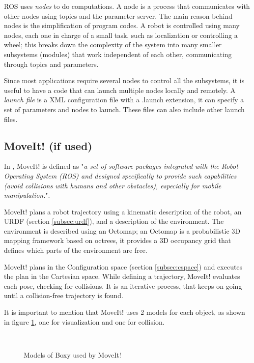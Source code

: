 ROS uses \textit{nodes} to do computations. A node is a process that communicates with other nodes using topics and the parameter server. The main reason behind nodes is the simplification of program codes. A robot is controlled using many nodes, each one in charge of a small task, such as localization or controlling a wheel; this breaks down the complexity of the system into many smaller subsystems (modules) that work independent of each other, communicating through topics and parameters.

Since most applications require several nodes to control all the subsystems, it is useful to have a code that can launch multiple nodes locally and remotely. A \textit{launch file} is a XML configuration file with a .launch extension, it can specify a set of parameters and nodes to launch. These files can also include other launch files. 

\subsection{MoveIt! (if used)}
\label{subsec:moveit}

In \citet{moveit}, MoveIt! is defined as "\textit{a set of software
	packages integrated with the Robot Operating System (ROS) and designed specifically to provide such capabilities (avoid collisions with humans and other obstacles), especially for mobile manipulation.}".

MoveIt! plans a robot trajectory using a kinematic description of the robot, an URDF (section \ref{subsec:urdf}), and a description of the environment. The environment is described using an Octomap; an Octomap is a probabilistic 3D mapping framework based on octrees, it provides a 3D occupancy grid that defines which parts of the environment are free.

MoveIt! plans in the Configuration space (section \ref{subsec:cspace}) and executes the plan in the Cartesian space. While defining a trajectory, MoveIt! evaluates each pose, checking for collisions. It is an iterative process, that keeps on going until a collision-free trajectory is found.

It is important to mention that MoveIt! uses 2 models for each object, as shown in figure \ref{fig:models}, one for visualization and one for collision. 
\begin{figure}[H]
	\centering
	\begin{subfigure}[][Visualization Model]
		{\texttt{[image: boxy/visual.png]}}
	\end{subfigure}
	~
	\begin{subfigure}[][Collision Model]
		{\texttt{[image: boxy/collision.png]}}
	\end{subfigure}
	\vspace{-15pt}
	\caption{Models of Boxy used by MoveIt!}
	\vspace{-10pt}
	\label{fig:models}
\end{figure}


